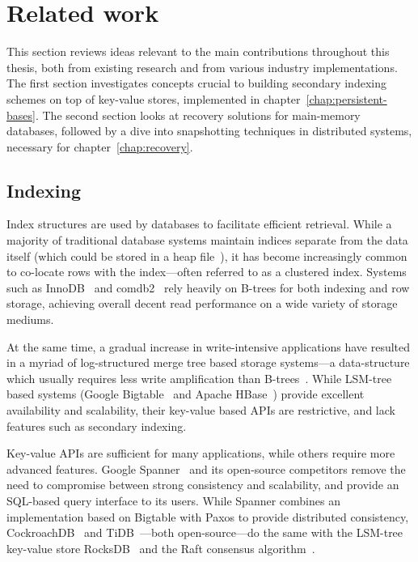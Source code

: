 \chapter{Related work}\label{chap:related-work}

This section reviews ideas relevant to the main contributions throughout this
thesis, both from existing research and from various industry implementations.
The first section investigates concepts crucial to building secondary indexing
schemes on top of key-value stores, implemented in
chapter~\ref{chap:persistent-bases}. The second section looks at recovery
solutions for main-memory databases, followed by a dive into snapshotting
techniques in distributed systems, necessary for chapter~\ref{chap:recovery}.

\newpage

\section{Indexing}

Index structures are used by databases to facilitate efficient retrieval. While
a majority of traditional database systems maintain indices separate from the
data itself (which could be stored in \eg a heap file~\cite{microsoft-heap,
psql-heap}), it has become increasingly common to co-locate rows with the
index---often referred to as a clustered index. Systems such as
InnoDB~\cite{innodb-source} and comdb2~\cite{comdb2} rely heavily on B-trees for
both indexing and row storage, achieving overall decent read performance on a
wide variety of storage mediums.

At the same time, a gradual increase in write-intensive applications have
resulted in a myriad of log-structured merge tree based storage systems---a
data-structure which usually requires less write amplification than
B-trees~\cite{lsm-vs-b}. While LSM-tree based systems (\eg Google
Bigtable~\cite{bigtable} and Apache HBase~\cite{hbase}) provide excellent
availability and scalability, their key-value based APIs are restrictive, and
lack features such as secondary indexing.

Key-value APIs are sufficient for many applications, while others require more
advanced features. Google Spanner~\cite{spanner} and its open-source competitors
remove the need to compromise between strong consistency and scalability, and
provide an SQL-based query interface to its users. While Spanner combines an
implementation based on Bigtable with Paxos to provide distributed consistency,
CockroachDB~\cite{cockroach} and TiDB~\cite{tidb}---both open-source---do the
same with the LSM-tree key-value store RocksDB~\cite{rocksdb} and the Raft
consensus algorithm~\cite{raft}.

